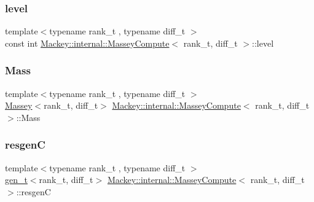 \mbox{\label{structMackey_1_1internal_1_1MasseyCompute_a8e1950e34cbfb467052e530f7a3c9e33}} 
\subsubsection{\texorpdfstring{level}{level}}
{\footnotesize\ttfamily template$<$typename rank\+\_\+t , typename diff\+\_\+t $>$ \\
const int \hyperlink{structMackey_1_1internal_1_1MasseyCompute}{Mackey\+::internal\+::\+Massey\+Compute}$<$ rank\+\_\+t, diff\+\_\+t $>$\+::level}

\mbox{\label{structMackey_1_1internal_1_1MasseyCompute_a82ffc479c0831910eb7c5c67e458c1c8}} 
\subsubsection{\texorpdfstring{Mass}{Mass}}
{\footnotesize\ttfamily template$<$typename rank\+\_\+t , typename diff\+\_\+t $>$ \\
\hyperlink{classMackey_1_1Massey}{Massey}$<$rank\+\_\+t, diff\+\_\+t$>$ \hyperlink{structMackey_1_1internal_1_1MasseyCompute}{Mackey\+::internal\+::\+Massey\+Compute}$<$ rank\+\_\+t, diff\+\_\+t $>$\+::Mass}

\mbox{\label{structMackey_1_1internal_1_1MasseyCompute_ad0e1acb8c1e9b5d8f7e7e23aa1eb6b72}} 
\subsubsection{\texorpdfstring{resgenC}{resgenC}}
{\footnotesize\ttfamily template$<$typename rank\+\_\+t , typename diff\+\_\+t $>$ \\
\hyperlink{namespaceMackey_a6bb0b2796632ba6c7f8ea192f7aecffe}{gen\+\_\+t}$<$rank\+\_\+t, diff\+\_\+t$>$ \hyperlink{structMackey_1_1internal_1_1MasseyCompute}{Mackey\+::internal\+::\+Massey\+Compute}$<$ rank\+\_\+t, diff\+\_\+t $>$\+::resgenC}

